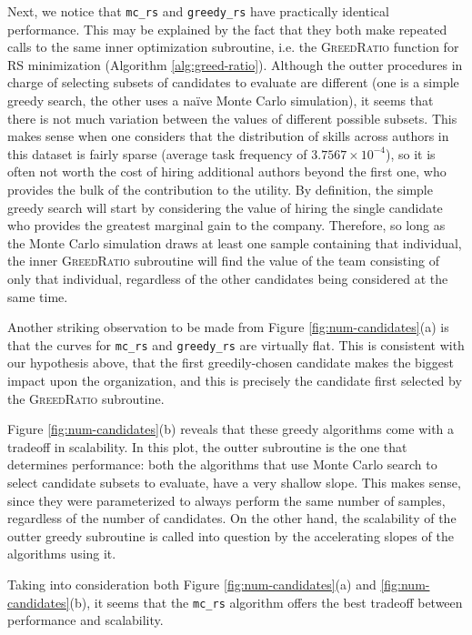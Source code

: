 Next, we notice that \texttt{mc\_rs} and \texttt{greedy\_rs} have practically identical performance.
This may be explained by the fact that they both make repeated calls to the same inner optimization subroutine, i.e. the \textsc{GreedRatio} function for RS minimization (Algorithm \ref{alg:greed-ratio}).
Although the outter procedures in charge of selecting subsets of candidates to evaluate are different (one is a simple greedy search, the other uses a na\"ive Monte Carlo simulation), it seems that there is not much variation between the values of different possible subsets.
This makes sense when one considers that the distribution of skills across authors in this dataset is fairly sparse (average task frequency of $ 3.7567 \times 10^{-4} $), so it is often not worth the cost of hiring additional authors beyond the first one, who provides the bulk of the contribution to the utility.
By definition, the simple greedy search will start by considering the value of hiring the single candidate who provides the greatest marginal gain to the company.
Therefore, so long as the Monte Carlo simulation draws at least one sample containing that individual, the inner \textsc{GreedRatio} subroutine will find the value of the team consisting of only that individual, regardless of the other candidates being considered at the same time.

Another striking observation to be made from Figure \ref{fig:num-candidates}(a) is that the curves for \texttt{mc\_rs} and \texttt{greedy\_rs} are virtually flat.
This is consistent with our hypothesis above, that the first greedily-chosen candidate makes the biggest impact upon the organization, and this is precisely the candidate first selected by the \textsc{GreedRatio} subroutine.

Figure \ref{fig:num-candidates}(b) reveals that these greedy algorithms come with a tradeoff in scalability.
In this plot, the outter subroutine is the one that determines performance: both the algorithms that use Monte Carlo search to select candidate subsets to evaluate, have a very shallow slope.
This makes sense, since they were parameterized to always perform the same number of samples, regardless of the number of candidates.
On the other hand, the scalability of the outter greedy subroutine is called into question by the accelerating slopes of the algorithms using it.

Taking into consideration both Figure \ref{fig:num-candidates}(a) and \ref{fig:num-candidates}(b), it seems that the \texttt{mc\_rs} algorithm offers the best tradeoff between performance and scalability.

